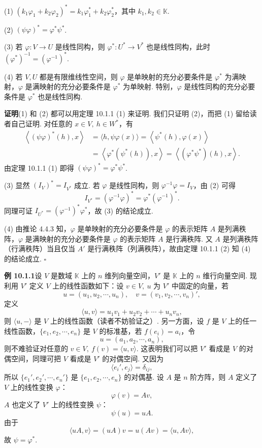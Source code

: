 \documentclass[UTF8, 12pt, fontset=fandol, oneside]{ctexart}
\begin{document}
(1) $(k_1\varphi_1+k_2\varphi_2)^*=k_1\varphi_1^*+k_2\varphi_2^*$，其中 $k_1,k_2\in\mathbb K$.

(2) $(\psi\varphi)^*=\varphi^*\psi^*$.

(3) 若 $\varphi:V\to U$ 是线性同构，则 $\varphi^*:U^*\to V^*$ 也是线性同构，此时 $(\varphi^*)^{-1}=(\varphi^{-1})^*$.

(4) 若 $V,U$ 都是有限维线性空间，则 $\varphi$ 是单映射的充分必要条件是 $\varphi^*$ 为满映射，$\varphi$ 是满映射的充分必要条件是 $\varphi^*$ 为单映射. 特别，$\varphi$ 是线性同构的充分必要条件是 $\varphi^*$ 也是线性同构.

\noindent\textbf{证明}\quad (1) 和 (2) 都可以用定理 10.1.1 (1) 来证明. 我们只证明 (2)，而把 (1) 留给读者自己证明. 对任意的 $x\in V,\ h\in W^*$，有
\[
\begin{aligned}
  \left\langle(\psi\varphi)^*(h),x\right\rangle
  &=\langle h,\psi\varphi(x)\rangle=\left\langle\psi^*(h),\varphi(x)\right\rangle\\
  &=\left\langle\varphi^*(\psi^*(h)),x\right\rangle
  =\left\langle(\varphi^*\psi^*)(h),x\right\rangle.
\end{aligned}
\]
由定理 10.1.1 (1) 即得 $(\psi\varphi)^*=\varphi^*\psi^*$.

(3) 显然 $(I_V)^*=I_{V^*}$ 成立. 若 $\varphi$ 是线性同构，则 $\varphi^{-1}\varphi=I_V$，由 (2) 可得
\[
  I_{V^*}=(\varphi^{-1}\varphi)^*=\varphi^*(\varphi^{-1})^*.
\]
同理可证 $I_{U^*}=(\varphi^{-1})^*\varphi^*$，故 (3) 的结论成立.

(4) 由推论 4.4.3 知，$\varphi$ 是单映射的充分必要条件是 $\varphi$ 的表示矩阵 $A$ 是列满秩阵，$\varphi$ 是满映射的充分必要条件是 $\varphi$ 的表示矩阵 $A$ 是行满秩阵. 又 $A$ 是列满秩阵（行满秩阵）当且仅当 $A'$ 是行满秩阵（列满秩阵），故由定理 10.1.1 (2) 知 (4) 的结论成立. $\square$

\noindent\textbf{例 10.1.1}\quad 设 $V$ 是数域 $\mathbb K$ 上的 $n$ 维列向量空间，$V'$ 是 $\mathbb K$ 上的 $n$ 维行向量空间. 现利用 $V'$ 定义 $V$ 上的线性函数如下：设 $v\in V,\ u$ 为 $V'$ 中固定的向量，若
\[
  u=(u_1,u_2,\cdots,u_n),\quad v=(v_1,v_2,\cdots,v_n)',
\]
定义
\[
  \langle u,v\rangle=u_1v_1+u_2v_2+\cdots+u_nv_n,
\]
则 $\langle u,-\rangle$ 是 $V$ 上的线性函数（读者不妨验证之）. 另一方面，设 $f$ 是 $V$ 上的任一线性函数，$\{e_1,e_2,\cdots,e_n\}$ 是 $V$ 的标准基，若 $f(e_i)=a_i$，令
\[
  u=(a_1,a_2,\cdots,a_n),
\]
则不难验证对任意的 $v\in V,\ f(v)=\langle u,v\rangle$. 这表明我们可以把 $V'$ 看成是 $V$ 的对偶空间，同理可把 $V$ 看成是 $V'$ 的对偶空间. 又因为
\[
  \langle e_i',e_j\rangle=\delta_{ij},
\]
所以 $\{e_1',e_2',\cdots,e_n'\}$ 是 $\{e_1,e_2,\cdots,e_n\}$ 的对偶基. 设 $A$ 是 $n$ 阶方阵，则 $A$ 定义了 $V$ 上的线性变换 $\varphi$：
\[
  \varphi(v)=Av,
\]
$A$ 也定义了 $V'$ 上的线性变换 $\psi$：
\[
  \psi(u)=uA.
\]
由于
\[
  \langle uA,v\rangle=(uA)v=u(Av)=\langle u,Av\rangle,
\]
故 $\psi=\varphi^*$.
\end{document}
